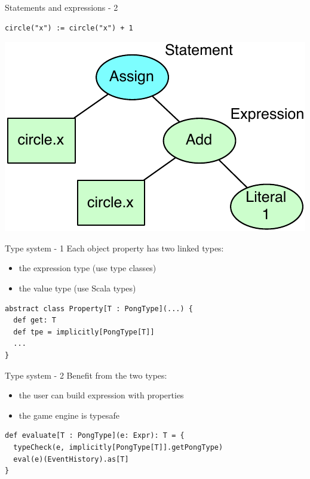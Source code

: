 \documentclass[12pt]{beamer}
\begin{document}
\begin{frame}[fragile]{Statements and expressions - 2}
\begin{lstlisting}
circle("x") := circle("x") + 1
\end{lstlisting}
\begin{center}
\includegraphics[scale=0.9]{images/AST_example}
\end{center}
\end{frame}


\begin{frame}[fragile]{Type system - 1}
Each object property has two linked types:
\begin{itemize}
\item the expression type (use type classes)
\item the value type (use Scala types)
\end{itemize}

\vspace*{5mm}

\begin{lstlisting}
abstract class Property[T : PongType](...) {
  def get: T
  def tpe = implicitly[PongType[T]]
  ...
}
\end{lstlisting}

\end{frame}


\begin{frame}[fragile]{Type system - 2}
Benefit from the two types:
\begin{itemize}
\item the user can build expression with properties
\item the game engine is typesafe
\end{itemize}

\vspace*{5mm}

\begin{lstlisting}
def evaluate[T : PongType](e: Expr): T = {
  typeCheck(e, implicitly[PongType[T]].getPongType)
  eval(e)(EventHistory).as[T]
}
\end{lstlisting}

\end{frame}
\end{document}
